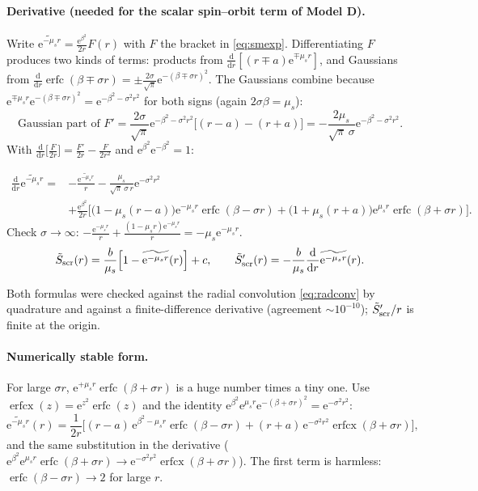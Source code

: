 \documentclass[11pt,a4paper]{article}
\numberwithin{equation}{section}
\theoremstyle{definition}
\theoremstyle{plain}
\theoremstyle{remark}
\newenvironment{keyresult}[1][Key result]{\begin{tcolorbox}[keybox,title={\small\bfseries #1},fonttitle=\small,coltitle=white,colbacktitle=MidnightBlue!70]}{\end{tcolorbox}}
\numberwithin{algorithm}{section}
\newcommand{\dd}{\mathrm{d}}
\newcommand{\ee}{\mathrm{e}}
\newcommand{\erfc}{\operatorname{erfc}}
\newcommand{\erfcx}{\operatorname{erfcx}}
\newcommand{\mus}{\mu_s}
\begin{document}
\paragraph{Derivative (needed for the scalar spin--orbit term of Model D).} Write $\widetilde{\ee^{-\mus r}}=\frac{\ee^{\beta^2}}{2r}F(r)$ with $F$ the bracket in \eqref{eq:smexp}. Differentiating $F$ produces two kinds of terms: products from $\frac{\dd}{\dd r}[(r\mp a)\ee^{\mp\mus r}]$, and Gaussians from $\frac{\dd}{\dd r}\erfc(\beta\mp\sigma r)=\pm\frac{2\sigma}{\sqrt\pi}\ee^{-(\beta\mp\sigma r)^2}$. The Gaussians combine because $\ee^{\mp\mus r}\ee^{-(\beta\mp\sigma r)^2}=\ee^{-\beta^2-\sigma^2r^2}$ for both signs (again $2\sigma\beta=\mus$):
\begin{equation*}
\text{Gaussian part of }F'=\frac{2\sigma}{\sqrt\pi}\ee^{-\beta^2-\sigma^2r^2}\big[(r-a)-(r+a)\big]=-\frac{2\mus}{\sqrt\pi\,\sigma}\ee^{-\beta^2-\sigma^2r^2}.
\end{equation*}
With $\frac{\dd}{\dd r}\big[\frac{F}{2r}\big]=\frac{F'}{2r}-\frac{F}{2r^2}$ and $\ee^{\beta^2}\ee^{-\beta^2}=1$:
\begin{keyresult}[Smeared exponential and its derivative]
\begin{equation}
\begin{split}
\frac{\dd}{\dd r}\widetilde{\ee^{-\mus r}}={}&-\frac{\widetilde{\ee^{-\mus r}}}{r}-\frac{\mus}{\sqrt\pi\,\sigma\,r}\ee^{-\sigma^2r^2}\\
&+\frac{\ee^{\beta^2}}{2r}\Big[\big(1-\mus(r-a)\big)\ee^{-\mus r}\erfc(\beta-\sigma r)+\big(1+\mus(r+a)\big)\ee^{\mus r}\erfc(\beta+\sigma r)\Big].
\end{split}
\end{equation}
Check $\sigma\to\infty$: $-\frac{\ee^{-\mus r}}r+\frac{(1-\mus r)\ee^{-\mus r}}{r}=-\mus\ee^{-\mus r}$. \checkmark
\begin{equation}
\tilde S_{\rm scr}(r)=\frac{b}{\mus}\Big[1-\widetilde{\ee^{-\mus r}}(r)\Big]+c,\qquad \tilde S_{\rm scr}'(r)=-\frac b{\mus}\frac{\dd}{\dd r}\widetilde{\ee^{-\mus r}}(r).
\end{equation}
\end{keyresult}
Both formulas were checked against the radial convolution \eqref{eq:radconv} by quadrature and against a finite-difference derivative (agreement $\sim10^{-10}$); $\tilde S_{\rm scr}'/r$ is finite at the origin.

\paragraph{Numerically stable form.} For large $\sigma r$, $\ee^{+\mus r}\erfc(\beta+\sigma r)$ is a huge number times a tiny one. Use $\erfcx(z)=\ee^{z^2}\erfc(z)$ and the identity $\ee^{\beta^2}\ee^{\mus r}\ee^{-(\beta+\sigma r)^2}=\ee^{-\sigma^2r^2}$:
\begin{equation}
\widetilde{\ee^{-\mus r}}(r)=\frac{1}{2r}\Big[(r-a)\,\ee^{\beta^2-\mus r}\erfc(\beta-\sigma r)+(r+a)\,\ee^{-\sigma^2r^2}\erfcx(\beta+\sigma r)\Big],
\end{equation}
and the same substitution in the derivative ($\ee^{\beta^2}\ee^{\mus r}\erfc(\beta+\sigma r)\to\ee^{-\sigma^2r^2}\erfcx(\beta+\sigma r)$). The first term is harmless: $\erfc(\beta-\sigma r)\to2$ for large $r$.
\end{document}
